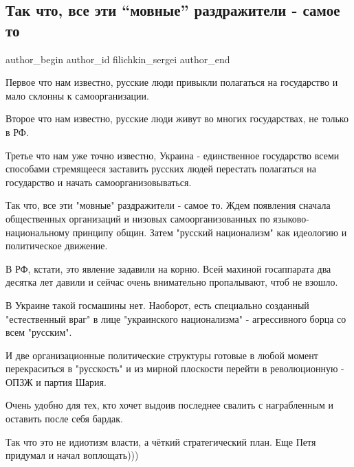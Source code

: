  
 
 
 
 
\subsection{Так что, все эти \enquote{мовные} раздражители - самое то}
\label{sec:17_01_2021.fb.filichkin_sergei.1.mova}
\ifcmt
  author_begin
   author_id filichkin_sergei
  author_end
\fi

Первое что нам известно, русские люди привыкли полагаться на государство и мало склонны к самоорганизации.

Второе что нам известно, русские люди живут во многих государствах, не только в РФ.

Третье что нам уже точно известно, Украина - единственное государство всеми
способами стремящееся заставить русских людей перестать полагаться на
государство и начать самоорганизовываться.

Так что, все эти "мовные" раздражители - самое то. Ждем появления сначала
общественных организаций и низовых самоорганизованных по языково-национальному
принципу общин. Затем "русский национализм" как идеологию и политическое
движение.

В РФ, кстати, это явление задавили на корню. Всей махиной госаппарата два
десятка лет давили и сейчас очень внимательно пропалывают, чтоб не взошло.

В Украине такой госмашины нет. Наоборот, есть специально созданный
"естественный враг" в лице "украинского национализма" - агрессивного борца со
всем "русским".

И две организационные политические структуры готовые в любой момент
перекраситься в "русскость" и из мирной плоскости перейти в революционную -
ОПЗЖ и партия Шария.

Очень удобно для тех, кто хочет выдоив последнее свалить с награбленным и
оставить после себя бардак.

Так что это не идиотизм власти, а чёткий стратегический план. Еще Петя придумал
и начал воплощать)))
